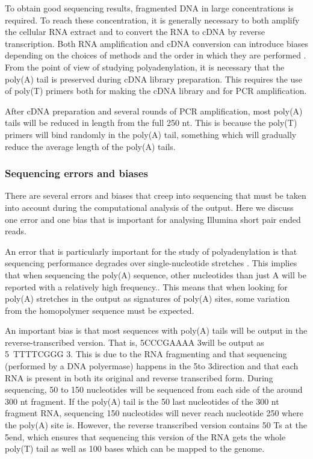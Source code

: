 To obtain good sequencing results, fragmented DNA in large concentrations is
required. To reach these concentration, it is generally necessary to both
amplify the cellular RNA extract and to convert the RNA to cDNA by reverse
transcription. Both RNA amplification and cDNA conversion can introduce biases
depending on the choices of methods and the order in which they are performed
\cite{wang_rna-seq:_2009}. From the point of view of studying polyadenylation,
it is necessary that the poly(A) tail is preserved during cDNA library
preparation. This requires the use of poly(T) primers both for making the cDNA
library and for PCR amplification.

After cDNA preparation and several rounds of PCR amplification, most poly(A)
tails will be reduced in length from the full 250 nt. This is because the
poly(T) primers will bind randomly in the poly(A) tail, something which will
gradually reduce the average length of the poly(A) tails.

\subsubsection{Sequencing errors and biases}
There are several errors and biases that creep into sequencing that must be
taken into account during the computational analysis of the output. Here we
discuss one error and one bias that is important for analysing Illumina short
pair ended reads.

An error that is particularly important for the study of polyadenylation is
that sequencing performance degrades over single-nucleotide stretches
\cite{minoche_evaluation_2011}. This implies that when sequencing the poly(A)
sequence, other nucleotides than just A will be reported with a relatively high
frequency.. This means that when looking for poly(A) stretches in the output as
signatures of poly(A) sites, some variation from the homopolymer sequence must
be expected.

An important bias is that most sequences with poly(A) tails will be output in
the reverse-transcribed version. That is, 5\p CCCGAAAA 3\p will be output as 5\
TTTTCGGG 3\p. This is due to the RNA fragmenting and that sequencing
(performed by a DNA polyermase) happens in the 5\p to 3\p direction and that
each RNA is present in both its original and reverse transcribed form. During
sequencing, 50 to 150 nucleotides will be sequenced from each side of the around
300 nt fragment. If the poly(A) tail is the 50 last nucleotides of the 300 nt
fragment RNA, sequencing 150 nucleotides will never reach nucleotide 250 where
the poly(A) site is. However, the reverse transcribed version contains 50 Ts at
the 5\p end, which ensures that sequencing this version of the RNA gets the
whole poly(T) tail as well as 100 bases which can be mapped to the genome.

